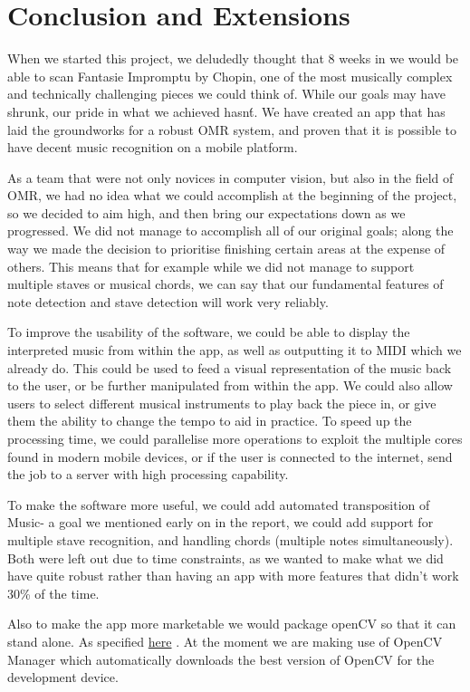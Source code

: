 \section{Conclusion and Extensions}

When we started this project, we deludedly thought that 8 weeks in we would be able to scan Fantasie Impromptu by Chopin, one of the most musically complex and technically challenging pieces we could think of. While our goals may have shrunk, our pride in what we achieved hasn\'t. We have created an app that has laid the groundworks for a robust OMR system, and proven that it is possible to have decent music recognition on a mobile platform. 

As a team that were not only novices in computer vision, but also in the field of OMR, we had no idea what we could accomplish at the beginning of the project, so we decided to aim high, and then bring our expectations down as we progressed. We did not manage to accomplish all of our original goals; along the way we made the decision to prioritise finishing certain areas at the expense of others. This means that for example while we did not manage to support multiple staves or musical chords, we can say that our fundamental features of note detection and stave detection will work very reliably.
 
To improve the usability of the software, we could be able to display the interpreted music from within the app, as well as outputting it to MIDI which we already do. This could be used to feed a visual representation of the music back to the user, or be further manipulated from within the app. We could also allow users to select different musical instruments to play back the piece in, or give them the ability to change the tempo to aid in practice. To speed up the processing time, we could parallelise more operations to exploit the multiple cores found in modern mobile devices, or if the user is connected to the internet, send the job to a server with high processing capability.
 
To make the software more useful, we could add automated transposition of Music- a goal we mentioned early on in the report, we could add support for multiple stave recognition, and handling chords (multiple notes simultaneously). Both were left out due to time constraints, as we wanted to make what we did have quite robust rather than having an app with more features that didn’t work 30\% of the time.

Also to make the app more marketable we would package openCV so that it can stand alone. As specified \href{http://docs.opencv.org/doc/tutorials/introduction/android_binary_package/dev_with_OCV_on_Android.html}{here} .
At the moment we are making use of OpenCV Manager which automatically downloads the best version of OpenCV for the development device.


